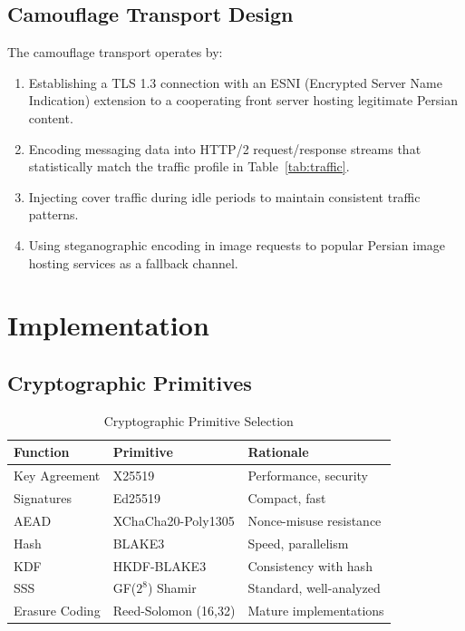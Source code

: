 \documentclass[11pt,a4paper]{article}
\begin{document}
\subsection{Camouflage Transport Design}

The camouflage transport operates by:

\begin{enumerate}
    \item Establishing a TLS 1.3 connection with an ESNI (Encrypted Server Name Indication) extension to a cooperating front server hosting legitimate Persian content.
    \item Encoding messaging data into HTTP/2 request/response streams that statistically match the traffic profile in Table~\ref{tab:traffic}.
    \item Injecting cover traffic during idle periods to maintain consistent traffic patterns.
    \item Using steganographic encoding in image requests to popular Persian image hosting services as a fallback channel.
\end{enumerate}

\section{Implementation}

\subsection{Cryptographic Primitives}

\begin{table}[H]
\centering
\caption{Cryptographic Primitive Selection}
\label{tab:primitives}
\begin{tabular}{lll}
\toprule
\textbf{Function} & \textbf{Primitive} & \textbf{Rationale} \\
\midrule
Key Agreement & X25519~\citep{bernstein2006curve25519} & Performance, security \\
Signatures & Ed25519~\citep{bernstein2012ed25519} & Compact, fast \\
AEAD & XChaCha20-Poly1305 & Nonce-misuse resistance \\
Hash & BLAKE3 & Speed, parallelism \\
KDF & HKDF-BLAKE3 & Consistency with hash \\
SSS & GF($2^8$) Shamir & Standard, well-analyzed \\
Erasure Coding & Reed-Solomon (16,32) & Mature implementations \\
\bottomrule
\end{tabular}
\end{table}
\end{document}
